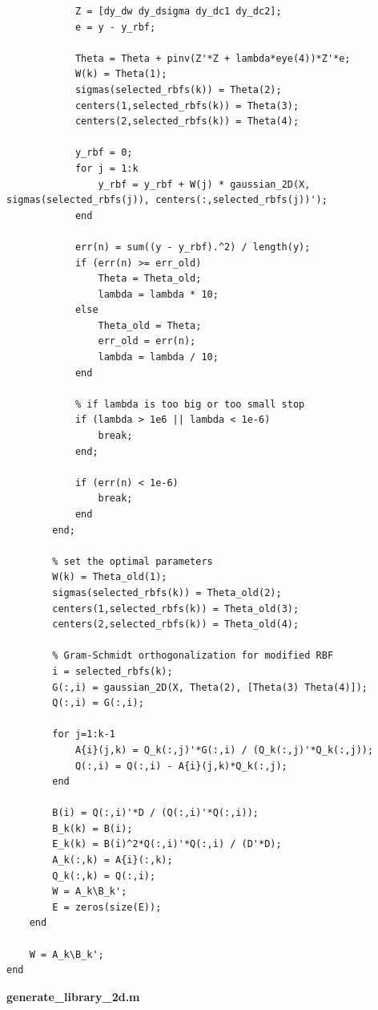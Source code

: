 \begin{lstlisting}
            Z = [dy_dw dy_dsigma dy_dc1 dy_dc2];
            e = y - y_rbf;

            Theta = Theta + pinv(Z'*Z + lambda*eye(4))*Z'*e;            
            W(k) = Theta(1);
            sigmas(selected_rbfs(k)) = Theta(2);
            centers(1,selected_rbfs(k)) = Theta(3);
            centers(2,selected_rbfs(k)) = Theta(4);
            
            y_rbf = 0;
            for j = 1:k
                y_rbf = y_rbf + W(j) * gaussian_2D(X, sigmas(selected_rbfs(j)), centers(:,selected_rbfs(j))');
            end

            err(n) = sum((y - y_rbf).^2) / length(y);
            if (err(n) >= err_old)
                Theta = Theta_old;
                lambda = lambda * 10;
            else
                Theta_old = Theta;
                err_old = err(n);
                lambda = lambda / 10;                
            end

            % if lambda is too big or too small stop
            if (lambda > 1e6 || lambda < 1e-6)
                break;
            end;
            
            if (err(n) < 1e-6)
                break;
            end
        end;
        
        % set the optimal parameters
        W(k) = Theta_old(1);
        sigmas(selected_rbfs(k)) = Theta_old(2);
        centers(1,selected_rbfs(k)) = Theta_old(3);
        centers(2,selected_rbfs(k)) = Theta_old(4);

        % Gram-Schmidt orthogonalization for modified RBF
        i = selected_rbfs(k);
        G(:,i) = gaussian_2D(X, Theta(2), [Theta(3) Theta(4)]);
        Q(:,i) = G(:,i);

        for j=1:k-1
            A{i}(j,k) = Q_k(:,j)'*G(:,i) / (Q_k(:,j)'*Q_k(:,j));
            Q(:,i) = Q(:,i) - A{i}(j,k)*Q_k(:,j);
        end

        B(i) = Q(:,i)'*D / (Q(:,i)'*Q(:,i));
        B_k(k) = B(i);
        E_k(k) = B(i)^2*Q(:,i)'*Q(:,i) / (D'*D);
        A_k(:,k) = A{i}(:,k);
        Q_k(:,k) = Q(:,i);
        W = A_k\B_k';
        E = zeros(size(E));
    end

    W = A_k\B_k';
end
\end{lstlisting}

\textbf{generate\_library\_2d.m}

